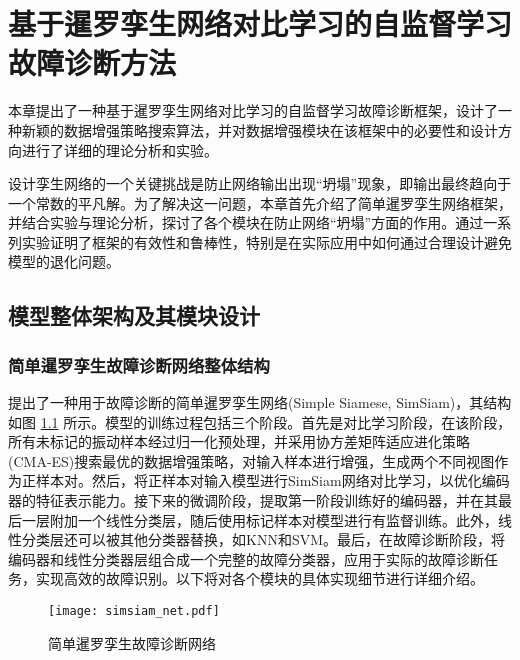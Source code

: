 \documentclass[master]{thesis-uestc}
\begin{document}
\chapter{基于暹罗孪生网络对比学习的自监督学习故障诊断方法}
本章提出了一种基于暹罗孪生网络对比学习的自监督学习故障诊断框架，设计了一种新颖的数据增强策略搜索算法，并对数据增强模块在该框架中的必要性和设计方向进行了详细的理论分析和实验。

设计孪生网络的一个关键挑战是防止网络输出出现“坍塌”现象，即输出最终趋向于一个常数的平凡解。为了解决这一问题，本章首先介绍了简单暹罗孪生网络框架，并结合实验与理论分析，探讨了各个模块在防止网络“坍塌”方面的作用。通过一系列实验证明了框架的有效性和鲁棒性，特别是在实际应用中如何通过合理设计避免模型的退化问题。
\FloatBarrier  %
\section{模型整体架构及其模块设计}
\subsection{简单暹罗孪生故障诊断网络整体结构}
提出了一种用于故障诊断的简单暹罗孪生网络(Simple Siamese, SimSiam)，其结构如图 \ref{simsiam_net} 所示。模型的训练过程包括三个阶段。首先是对比学习阶段，在该阶段，所有未标记的振动样本经过归一化预处理，并采用协方差矩阵适应进化策略(CMA-ES)搜索最优的数据增强策略，对输入样本进行增强，生成两个不同视图作为正样本对。然后，将正样本对输入模型进行SimSiam网络对比学习，以优化编码器的特征表示能力。接下来的微调阶段，提取第一阶段训练好的编码器，并在其最后一层附加一个线性分类层，随后使用标记样本对模型进行有监督训练。此外，线性分类层还可以被其他分类器替换，如KNN和SVM。最后，在故障诊断阶段，将编码器和线性分类器层组合成一个完整的故障分类器，应用于实际的故障诊断任务，实现高效的故障识别。以下将对各个模块的具体实现细节进行详细介绍。

\begin{figure}[h]
    \centering
    \texttt{[image: simsiam\_net.pdf]}
    \caption{简单暹罗孪生故障诊断网络}
    \label{simsiam_net}
\end{figure}
\FloatBarrier  %
\end{document}
